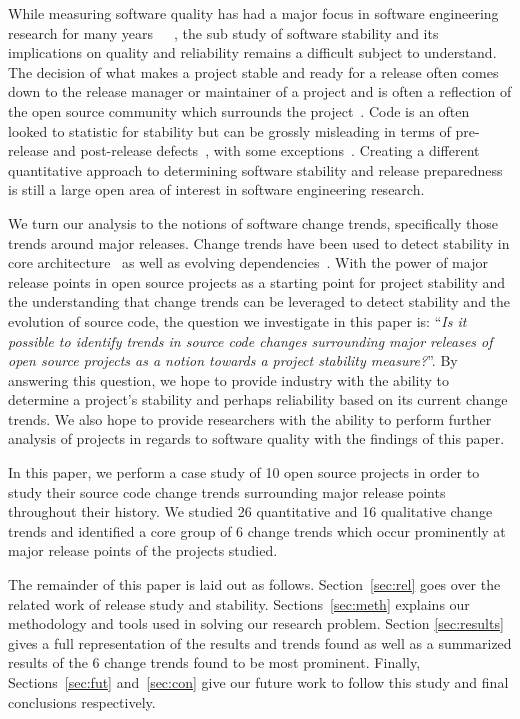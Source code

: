 \documentclass[conference]{IEEEtran}
\begin{document}
While measuring software quality has had a major focus in software engineering research for many years~\cite{Bowen:1978:CAS}~\cite{Grady:1993:PRM}~\cite{ISOIEC9126},
the sub study of software stability and its implications on quality and reliability remains a difficult subject to understand. 
The decision of what makes a project stable and ready
for a release often comes down to the release manager or maintainer of a project and is often a reflection of the open source community which surrounds 
the project~\cite{Conway:1968}. Code is an often looked to statistic for stability but can be grossly misleading
in terms of pre-release and post-release defects~\cite{Fenton:2000:QAF}, with some exceptions~\cite{Nagappan:2005:URC}. 
Creating a different quantitative approach to determining software stability and release preparedness is still a large open area of
interest in software engineering research.

We turn our analysis to the notions of software change trends, specifically those trends around major releases. Change trends have been used to detect
stability in core architecture~\cite{Wermelinger:2008:AEE} as well as evolving dependencies~\cite{Businge:2010:ESE}.
With the power of major release points in open source projects as a starting point for project stability and the understanding that change trends can
be leveraged to detect stability and the evolution of source code, the question we investigate in this paper is:
``\textit{Is it possible to identify trends in source code changes surrounding major releases of open source projects as a notion towards a project
stability measure?}''. By answering this question, we hope to provide industry with the ability to determine a project's stability and perhaps
reliability based on its current change trends. We also hope to provide researchers with the ability to perform further analysis of projects in
regards to software quality with the findings of this paper.

In this paper, we perform a case study of 10 open source projects in order to study their source code change trends surrounding major release points
throughout their history. We studied 26 quantitative and 16 qualitative change trends and identified a core group of 6 change trends which occur
prominently at major release points of the projects studied.

The remainder of this paper is laid out as follows. Section~\ref{sec:rel} goes over the related work of release study and stability. Sections~\ref{sec:meth}
explains our methodology and tools used in solving our research problem.
Section \ref{sec:results} gives a full representation of the results and trends found as well as a summarized results of the 6 change trends found
to be most prominent. Finally, Sections~\ref{sec:fut} and~\ref{sec:con} give our future work to follow this study and final conclusions respectively.
\end{document}
